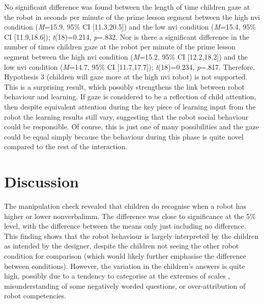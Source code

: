 No significant difference was found between the length of time children gaze at the robot in seconds per minute of the prime lesson segment between the high \acrshort{nvi} condition (\textit{M}=15.9, 95\% CI [11.3,20.5]) and the low \acrshort{nvi} condition (\textit{M}=15.4, 95\% CI [11.9,18.6]); \textit{t}(18)=0.214, \textit{p}=.832. Nor is there a significant difference in the number of times children gaze at the robot per minute of the prime lesson segment between the high \acrshort{nvi} condition (\textit{M}=15.2, 95\% CI [12.2,18.2]) and the low \acrshort{nvi} condition (\textit{M}=14.7, 95\% CI [11.7,17.7]); \textit{t}(18)=0.234, \textit{p}=.817. Therefore, Hypothesis 3 (children will gaze more at the high \acrshort{nvi} robot) is not supported. This is a surprising result, which possibly strengthens the link between robot behaviour and \gls{learning}. If gaze is considered to be a reflection of child attention, then despite equivalent attention during the key piece of \gls{learning} input from the robot the \gls{learning} results still vary, suggesting that the robot social behaviour could be responsible. Of course, this is just one of many possibilities and the gaze could be equal simply because the behaviour during this phase is quite novel compared to the rest of the interaction.

\section{Discussion}\label{sec:nviprimes-discussion}
The manipulation check revealed that children do recognise when a robot has higher or lower \gls{nonverbalimm}. The difference was close to significance at the 5\% level, with the difference between the means only just including no difference. This finding shows that the robot behaviour is largely interpreted by the children as intended by the designer, despite the children not seeing the other robot condition for comparison (which would likely further emphasise the difference between conditions). However, the variation in the children's answers is quite high, possibly due to a tendency to categorise at the extremes of scales \citep{borgers2004response}, misunderstanding of some negatively worded questions, or over-attribution of robot competencies.

